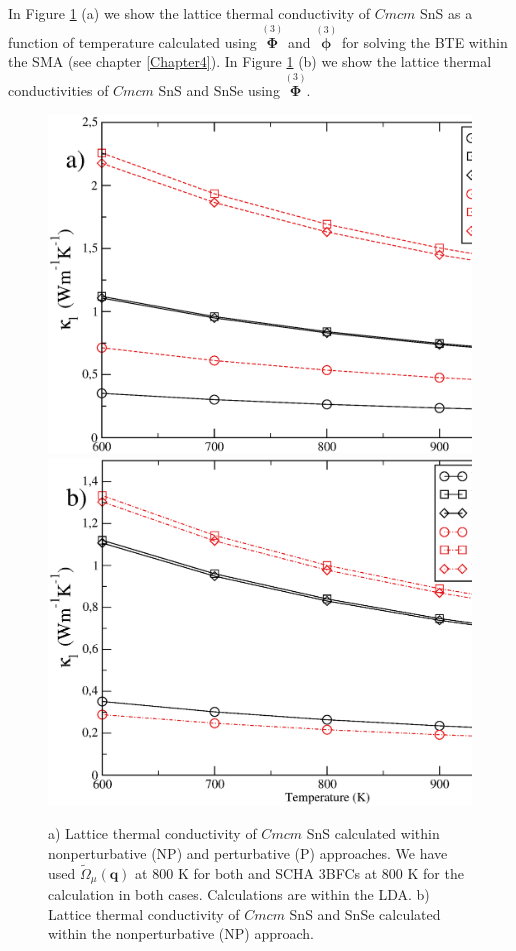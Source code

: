 In Figure \ref{tk-sns} (a) we show the lattice thermal conductivity of $Cmcm$ SnS as a function of temperature calculated using $\overset{(3)}{\boldsymbol{\Phi}}$ and $\overset{(3)}{\boldsymbol{\phi}}$ for solving the BTE within
the SMA (see chapter \ref{Chapter4}). In Figure \ref{tk-sns} (b) we show the lattice thermal conductivities of $Cmcm$ SnS and SnSe using $\overset{(3)}{\boldsymbol{\Phi}}$.
\begin{figure}[ht]
\begin{center}
\includegraphics[width=0.8\linewidth]{Figures/tk-paper1.eps}
\includegraphics[width=0.8\linewidth]{Figures/tk-paper2.eps}
\caption[Lattice thermal conductivity of SnS and SnSe.]{a) Lattice thermal conductivity of $Cmcm$ SnS calculated within nonperturbative (NP) and perturbative (P) approaches. We have used $\tilde{\Omega}_{\mu}(\mathbf{q})$ at $800$ K 
for both and SCHA 3BFCs at $800$ K for the calculation in both cases. Calculations are within the LDA. b) Lattice thermal conductivity of $Cmcm$ SnS and SnSe calculated within the nonperturbative (NP) approach.}
\label{tk-sns}
\end{center}
\end{figure}
